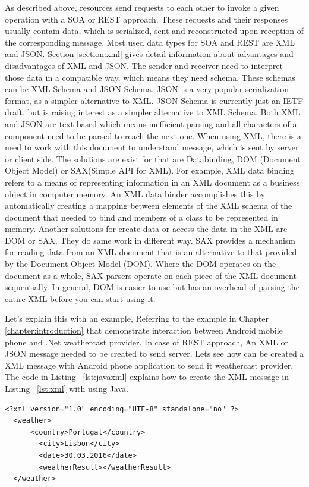 As described above, resources send requests to each other to invoke a given operation with a SOA or REST approach. These requests and their responses usually contain data, which is serialized, sent and reconstructed upon reception of the corresponding message. Most used data types for SOA and REST are XML and JSON. Section \ref{section:xml} gives detail information about advantages and disadvantages of XML and JSON. The sender and receiver need to interpret those data in a compatible way, which means they need schema. These schemas can be XML Schema and JSON Schema. JSON is a very popular serialization format, as a simpler alternative to XML. JSON Schema is currently just an IETF draft\citep{thesis:arch1}, but is raising interest as a simpler alternative to XML Schema. Both XML and JSON are text based which means inefficient parsing and all characters of a component need to be parsed to reach the next one.
When using XML, there is a need to work with this document to understand message, which is sent by server or client side. The solutions are exist for that are Databinding, DOM (Document Object Model) or SAX(Simple API for XML)\citep{thesis:arch20}. For example, XML data binding refers to a means of representing information in an XML document as a business object in computer memory. An XML data binder accomplishes this by automatically creating a mapping between elements of the XML schema of the document that needed to bind and members of a class to be represented in memory. Another solutions for create data or access the data in the XML are DOM or SAX. They do same work in different way. SAX provides a mechanism for reading data from an XML document that is an alternative to that provided by the Document Object Model (DOM). Where the DOM operates on the document as a whole, SAX parsers operate on each piece of the XML document sequentially. In general, DOM is easier to use but has an overhead of parsing the entire XML before you can start using it.

Let's explain this with an example, Referring to the example in Chapter \ref{chapter:introduction} that demonstrate interaction between Android mobile phone and .Net weathercast provider. In case of REST approach, An XML or JSON message needed to be created to send server. Lets see how can be created a XML message with Android phone application to send it weathercast provider. The code in Listing ~\ref{lst:javaxml} explains how to create the XML message in Listing ~\ref{lst:xml} with using Java.

\begin{lstlisting}[caption=Example XML message to send weathercast provider, label=lst:xml]
  <?xml version="1.0" encoding="UTF-8" standalone="no" ?>
  <weather>
      <country>Portugal</country>
  		<city>Lisbon</city>
  		<date>30.03.2016</date>
  		<weatherResult></weatherResult>
  </weather>
\end{lstlisting}

